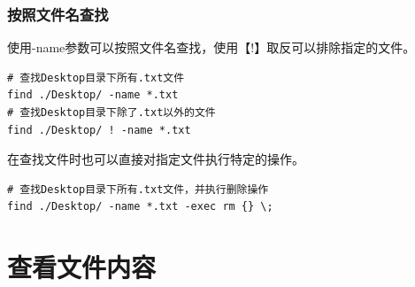 \documentclass[12pt, openany, oneside]{book}
\begin{document}
\begin{table}[H]
    \centering
    \caption{文件类型}
\end{table}

\subsubsection{按照文件名查找}

使用-name参数可以按照文件名查找，使用【!】取反可以排除指定的文件。

\vspace{-0.5cm}

\begin{lstlisting}
# 查找Desktop目录下所有.txt文件
find ./Desktop/ -name *.txt
# 查找Desktop目录下除了.txt以外的文件
find ./Desktop/ ! -name *.txt
\end{lstlisting}

在查找文件时也可以直接对指定文件执行特定的操作。

\vspace{-0.5cm}

\begin{lstlisting}
# 查找Desktop目录下所有.txt文件，并执行删除操作
find ./Desktop/ -name *.txt -exec rm {} \;
\end{lstlisting}

\newpage

\section{查看文件内容}
\end{document}
